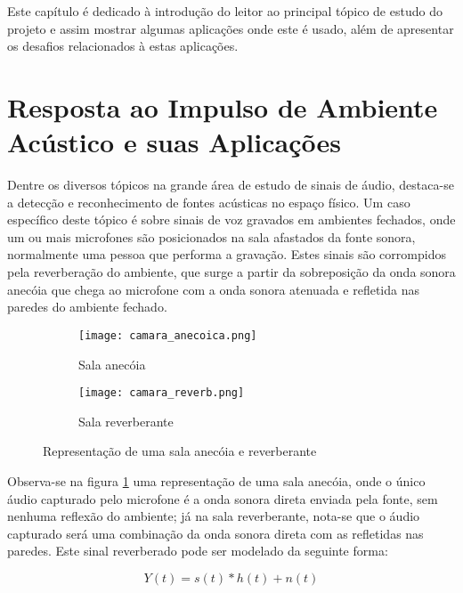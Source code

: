 Este capítulo é dedicado à introdução do leitor ao principal tópico de estudo do projeto e assim mostrar
algumas aplicações onde este é usado, além de apresentar os desafios relacionados à estas aplicações.

\section{Resposta ao Impulso de Ambiente Acústico e suas Aplicações}

Dentre os diversos tópicos na grande área de estudo de sinais de áudio, destaca-se a detecção e reconhecimento de fontes acústicas no espaço físico.
Um caso específico deste tópico é sobre sinais de voz gravados em ambientes fechados, onde um ou mais microfones são posicionados na sala afastados
da fonte sonora, normalmente uma pessoa que performa a gravação.
Estes sinais são corrompidos pela reverberação do ambiente, que surge a partir da sobreposição da onda sonora anecóia que chega ao microfone com a 
onda sonora atenuada e refletida nas paredes do ambiente fechado. 

\begin{figure} [H]
    \begin{subfigure}{.5\textwidth}
        \centering
        \texttt{[image: camara\_anecoica.png]}
        \caption{Sala anecóia}    
    \end{subfigure}
    \begin{subfigure}{.5\textwidth}
        \centering
        \texttt{[image: camara\_reverb.png]}    
        \caption{Sala reverberante}    
    \end{subfigure}
    \caption{Representação de uma sala anecóia e reverberante}
    \label{fig:Rooms}
\end{figure}

Observa-se na figura \ref{fig:Rooms} uma representação de uma sala anecóia, onde o único áudio capturado pelo microfone é a onda sonora direta
enviada pela fonte, sem nenhuma reflexão do ambiente; já na sala reverberante, nota-se que o áudio capturado será uma combinação da onda sonora direta
com as refletidas nas paredes. 
Este sinal reverberado pode ser modelado da seguinte forma:

\begin{equation} \label{eqn:model}
    Y(t) = s(t) \ast h(t) + n(t)
\end{equation}


